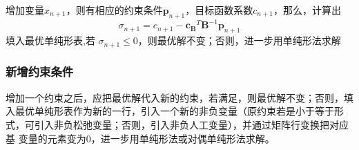 \documentclass{book}
\begin{document}
增加变量$x_{n+1}$，则有相应的约束条件$\boldsymbol{p}_{n+1}$，目标函数系数$c_{n+1}$，那么，计算出$$\sigma_{n+1}=c_{n+1}-\boldsymbol{c_B}^T\boldsymbol{B}^{-1}\boldsymbol{p}_{n+1}$$
填入最优单纯形表,若 $\sigma_{n+1} \le 0$，则最优解不变；否则，进一步用单纯形法求解

\subsubsection{新增约束条件}

增加一个约束之后，应把最优解代入新的约束，若满足，则最优解不变；否则，填入最优单纯形表作为新的一行，引入一个新的非负变量（原约束若是小于等于形
式，可引入非负松弛变量；否则，引入非负人工变量），并通过矩阵行变换把对应基
变量的元素变为0，进一步用单纯形法或对偶单纯形法求解。
\end{document}
